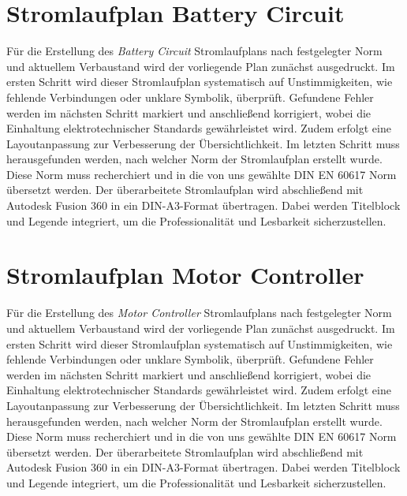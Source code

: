 \section*{Stromlaufplan Battery Circuit}
Für die Erstellung des \textit{Battery Circuit} Stromlaufplans nach festgelegter Norm und aktuellem Verbaustand wird der vorliegende Plan zunächst ausgedruckt. Im ersten Schritt wird dieser Stromlaufplan systematisch auf Unstimmigkeiten, wie fehlende Verbindungen oder unklare Symbolik, überprüft. Gefundene Fehler werden im nächsten Schritt markiert und anschließend korrigiert, wobei die Einhaltung elektrotechnischer Standards gewährleistet wird. Zudem erfolgt eine Layoutanpassung zur Verbesserung der Übersichtlichkeit. Im letzten Schritt muss herausgefunden werden, nach welcher Norm der Stromlaufplan erstellt wurde. Diese Norm muss recherchiert und in die von uns gewählte DIN EN 60617 Norm \glqq übersetzt\grqq {} werden. Der überarbeitete Stromlaufplan wird abschließend mit Autodesk Fusion 360 in ein DIN-A3-Format übertragen. Dabei werden Titelblock und Legende integriert, um die Professionalität und Lesbarkeit sicherzustellen.


\addtocounter{page}{1} %

\section*{Stromlaufplan Motor Controller}
Für die Erstellung des \textit{Motor Controller} Stromlaufplans nach festgelegter Norm und aktuellem Verbaustand wird der vorliegende Plan zunächst ausgedruckt. Im ersten Schritt wird dieser Stromlaufplan systematisch auf Unstimmigkeiten, wie fehlende Verbindungen oder unklare Symbolik, überprüft. Gefundene Fehler werden im nächsten Schritt markiert und anschließend korrigiert, wobei die Einhaltung elektrotechnischer Standards gewährleistet wird. Zudem erfolgt eine Layoutanpassung zur Verbesserung der Übersichtlichkeit. Im letzten Schritt muss herausgefunden werden, nach welcher Norm der Stromlaufplan erstellt wurde. Diese Norm muss recherchiert und in die von uns gewählte DIN EN 60617 Norm \glqq übersetzt\grqq {} werden. Der überarbeitete Stromlaufplan wird abschließend mit Autodesk Fusion 360 in ein DIN-A3-Format übertragen. Dabei werden Titelblock und Legende integriert, um die Professionalität und Lesbarkeit sicherzustellen.

